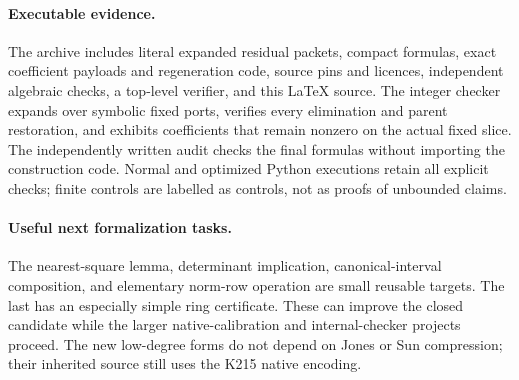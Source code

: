 \documentclass[11pt]{article}
\begin{document}
\paragraph{Executable evidence.}
The archive includes literal expanded residual packets, compact formulas,
exact coefficient payloads and regeneration code, source pins and licences,
independent algebraic checks, a top-level verifier, and this LaTeX source.
The integer checker expands over symbolic fixed ports, verifies every
elimination and parent restoration, and exhibits coefficients that remain
nonzero on the actual fixed slice. The independently written audit checks
the final formulas without importing the construction code. Normal and
optimized Python executions retain all explicit checks; finite controls
are labelled as controls, not as proofs of unbounded claims.

\paragraph{Useful next formalization tasks.}
The nearest-square lemma, determinant implication, canonical-interval
composition, and elementary norm-row operation are small reusable targets.
The last has an especially simple ring certificate. These can improve the
closed candidate while the larger native-calibration and internal-checker
projects proceed. The new low-degree forms do not depend on Jones or Sun
compression; their inherited source still uses the K215 native encoding.

\appendix

\end{document}

